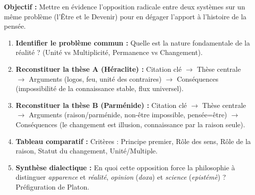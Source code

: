 \documentclass[11pt]{article}
\begin{document}
\begin{methode}
\textbf{Objectif :} Mettre en évidence l'opposition radicale entre deux systèmes sur un même problème (l'Être et le Devenir) pour en dégager l'apport à l'histoire de la pensée.
\begin{enumerate}
    \item \textbf{Identifier le problème commun :} Quelle est la nature fondamentale de la réalité ? (Unité vs Multiplicité, Permanence vs Changement).
    \item \textbf{Reconstituer la thèse A (Héraclite) :} Citation clé $\rightarrow$ Thèse centrale $\rightarrow$ Arguments (logos, feu, unité des contraires) $\rightarrow$ Conséquences (impossibilité de la connaissance stable, flux universel).
    \item \textbf{Reconstituer la thèse B (Parménide) :} Citation clé $\rightarrow$ Thèse centrale $\rightarrow$ Arguments (raison/parménide, non-être impossible, pensée=être) $\rightarrow$ Conséquences (le changement est illusion, connaissance par la raison seule).
    \item \textbf{Tableau comparatif :} Critères : Principe premier, Rôle des sens, Rôle de la raison, Statut du changement, Unité/Multiple.
    \item \textbf{Synthèse dialectique :} En quoi cette opposition force la philosophie à distinguer \emph{apparence} et \emph{réalité}, \emph{opinion} (\emph{doxa}) et \emph{science} (\emph{epistémè}) ? Préfiguration de Platon.
\end{enumerate}
\end{methode}
\end{document}

